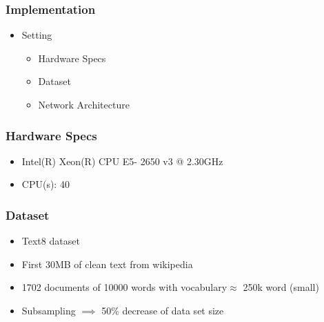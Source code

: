 \begin{frame}\frametitle{Implementation}
\begin{itemize}
\item Setting
\begin{itemize}
\item Hardware Specs
\item Dataset 
\item Network Architecture 
\end{itemize}
\end{itemize}
\end{frame}
\begin{frame}
\frametitle{Hardware Specs} 
\begin{itemize}
\item Intel(R) Xeon(R) CPU E5- 2650 v3 @ 2.30GHz
\item CPU(s):                40
\end{itemize}
\end{frame}
\begin{frame}
\frametitle{Dataset} 
\begin{itemize}
\item Text8 dataset 
\item First 30MB of clean text from wikipedia 
\item 1702 documents of 10000 words  with vocabulary$\approx$ 250k word (small) 
\item Subsampling $\implies$ 50\% decrease of data set size
\end{itemize}
\end{frame}